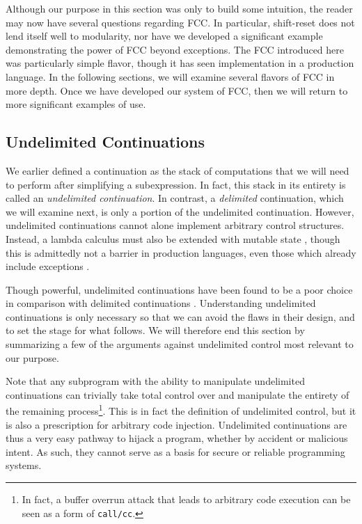 \documentclass[11pt]{article}
\begin{document}
Although our purpose in this section was only to build some intuition, the reader may now have several questions regarding FCC.
In particular, shift-reset does not lend itself well to modularity, nor have we developed a significant example demonstrating the power of FCC beyond exceptions.
The FCC introduced here was particularly simple flavor, though it has seen implementation in a production language.
In the following sections, we will examine several flavors of FCC in more depth.
Once we have developed our system of FCC, then we will return to more significant examples of use.


\subsection{Undelimited Continuations}
\label{undelimControl}

We earlier defined a continuation as the stack of computations that we will need to perform after simplifying a subexpression.
In fact, this stack in its entirety is called an \emph{undelimited continuation}.
In contrast, a \emph{delimited} continuation, which we will examine next, is only a portion of the undelimited continuation.
However, undelimited continuations cannot alone implement arbitrary control structures.
Instead, a lambda calculus must also be extended with mutable state \cite{Filinski94}, though this is admittedly not a barrier in production languages, even those which already include exceptions \cite{GreatEscape}.

Though powerful, undelimited continuations have been found to be a poor choice in comparison with delimited continuations \cite{MFDC}\cite{continuationsInProcObjs}\cite{HandlingControl}\cite{Sitaram90}.
Understanding undelimited continuations is only necessary so that we can avoid the flaws in their design, and to set the stage for what follows.
We will therefore end this section by summarizing a few of the arguments against undelimited control most relevant to our purpose.

Note that any subprogram with the ability to manipulate undelimited continuations can trivially take total control over and manipulate the entirety of the remaining process\footnote{In fact, a buffer overrun attack that leads to arbitrary code execution can be seen as a form of \texttt{call/cc}.}.
This is in fact the definition of undelimited control, but it is also a prescription for arbitrary code injection.
Undelimited continuations are thus a very easy pathway to hijack a program, whether by accident or malicious intent.
As such, they cannot serve as a basis for secure or reliable programming systems.
\end{document}
